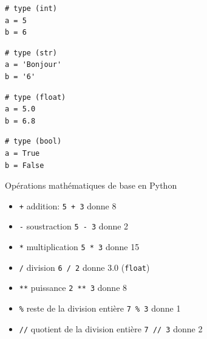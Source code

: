 \begin{minipage}{0.19\linewidth}
\begin{lstlisting}[numbers=none]
# type (int)
a = 5
b = 6
\end{lstlisting}
    \end{minipage}\hfill
    \begin{minipage}{0.19\linewidth}    
\begin{lstlisting}[numbers=none]   
# type (str)
a = 'Bonjour'
b = '6'   
\end{lstlisting}    
    \end{minipage}\hfill
    \begin{minipage}{0.19\linewidth}    
\begin{lstlisting}[numbers=none] 
# type (float)
a = 5.0 
b = 6.8
\end{lstlisting}    
    \end{minipage}\hfill{}
\begin{minipage}{0.19\linewidth}    
\begin{lstlisting}[numbers=none]  
# type (bool)
a = True
b = False
\end{lstlisting}    
    \end{minipage}

\begin{easybox}{Opérations mathématiques de base en Python}{}
	\begin{minipage}{0.43\linewidth}
		\begin{itemize}[]
        \item[] \texttt{+} \quad  addition:  \verb~5 + 3~ donne 8
        \item[] \texttt{-} \quad  soustraction \verb~5 - 3~ donne 2
        \item[] \texttt{*} \quad  multiplication \verb~5 * 3~ donne 15
        \item[] \texttt{/} \quad  division \verb~6 / 2~ donne 3.0 (\texttt{float})
\end{itemize}
	\end{minipage}\hfill{}
	\begin{minipage}{0.55\linewidth}
\begin{itemize}[]
        \item[] \texttt{**} \quad  puissance \verb~2 ** 3~ donne 8
        \item[] \texttt{\%} \quad  reste de la division entière \texttt{7 \% 3} donne 1
        \item[] \texttt{//} \quad  quotient de la division entière \texttt{7 // 3} donne 2
    \end{itemize}
	\end{minipage}
\end{easybox}

